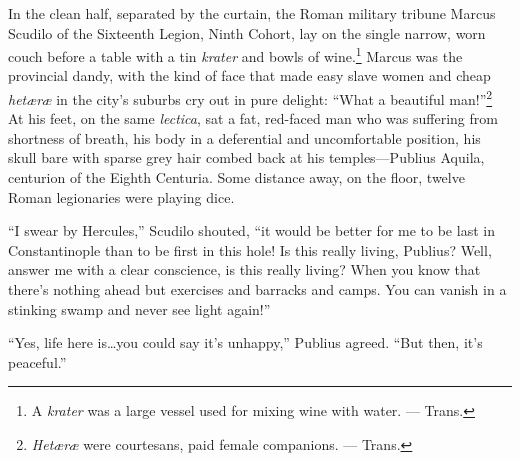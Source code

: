 In the clean half, separated by the curtain, the Roman military
tribune Marcus Scudilo of the Sixteenth Legion, Ninth Cohort, lay on
the single narrow, worn couch before a table with a tin
\textit{krater} and bowls of wine.\footnote{A \textit{krater} was a
  large vessel used for mixing wine with water. --- Trans.} Marcus was
the provincial dandy, with the kind of face that made easy slave women
and cheap \textit{het\ae r\ae} in the city's suburbs cry out in pure
delight: ``What a beautiful man!''\footnote{\textit{Het\ae r\ae} were
  courtesans, paid female companions. --- Trans.} At his feet, on the
same \textit{lectica}, sat a fat, red-faced man who was suffering from
shortness of breath, his body in a deferential and uncomfortable
position, his skull bare with sparse grey hair combed back at his
temples---Publius Aquila, centurion of the Eighth Centuria. Some
distance away, on the floor, twelve Roman legionaries were playing
dice.

``I swear by Hercules,'' Scudilo shouted, ``it would be better for me
to be last in Constantinople than to be first in this hole! Is this
really living, Publius? Well, answer me with a clear conscience, is
this really living? When you know that there's nothing ahead but
exercises and barracks and camps. You can vanish in a stinking swamp
and never see light again!'' %

``Yes, life here is\ldots{}you could say it's unhappy,'' Publius
agreed. ``But then, it's peaceful.'' %

